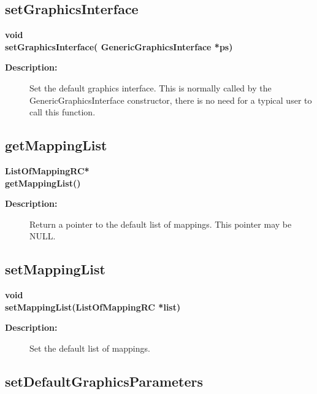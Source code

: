 \subsection{setGraphicsInterface}
 
\begin{flushleft} \textbf{%
void  \\ 
\settowidth{\OvertureIncludeArgIndent}{setGraphicsInterface(}%
setGraphicsInterface( GenericGraphicsInterface *ps)
}\end{flushleft}
\begin{description}
\item[{\bf Description:}] 
   Set the default graphics interface. This is normally called by the GenericGraphicsInterface constructor,
 there is no need for a typical user to call this function.
\end{description}
\subsection{getMappingList}
 
\begin{flushleft} \textbf{%
ListOfMappingRC*  \\ 
\settowidth{\OvertureIncludeArgIndent}{getMappingList(}%
getMappingList()
}\end{flushleft}
\begin{description}
\item[{\bf Description:}] 
   Return a pointer to the default list of mappings. This pointer may be NULL.
\end{description}
\subsection{setMappingList}
 
\begin{flushleft} \textbf{%
void  \\ 
\settowidth{\OvertureIncludeArgIndent}{setMappingList(}%
setMappingList(ListOfMappingRC *list)
}\end{flushleft}
\begin{description}
\item[{\bf Description:}] 
   Set the default list of mappings.
\end{description}
\subsection{setDefaultGraphicsParameters}
 
